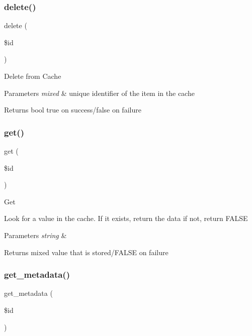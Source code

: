 \subsubsection{\texorpdfstring{delete()}{delete()}}
{\footnotesize\ttfamily delete (\begin{DoxyParamCaption}\item[{}]{\$id }\end{DoxyParamCaption})}

Delete from Cache


\begin{DoxyParams}{Parameters}
{\em mixed} & unique identifier of the item in the cache \\
\hline
\end{DoxyParams}
\begin{DoxyReturn}{Returns}
bool true on success/false on failure 
\end{DoxyReturn}
\mbox{\label{class_c_i___cache__apc_a50e3bfb586b2f42932a6a93f3fbb0828}} 
\subsubsection{\texorpdfstring{get()}{get()}}
{\footnotesize\ttfamily get (\begin{DoxyParamCaption}\item[{}]{\$id }\end{DoxyParamCaption})}

Get

Look for a value in the cache. If it exists, return the data if not, return F\+A\+L\+SE


\begin{DoxyParams}{Parameters}
{\em string} & \\
\hline
\end{DoxyParams}
\begin{DoxyReturn}{Returns}
mixed value that is stored/\+F\+A\+L\+SE on failure 
\end{DoxyReturn}
\mbox{\label{class_c_i___cache__apc_a59635cf18e997c5141bffa05ff7622e0}} 
\subsubsection{\texorpdfstring{get\+\_\+metadata()}{get\_metadata()}}
{\footnotesize\ttfamily get\+\_\+metadata (\begin{DoxyParamCaption}\item[{}]{\$id }\end{DoxyParamCaption})}

